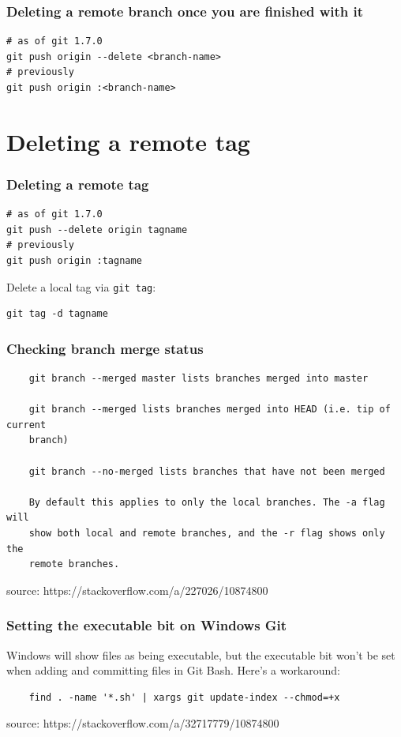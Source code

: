\documentclass{git_course}
\begin{document}
\begin{frame}[fragile]
    \frametitle{Deleting a remote branch once you are finished with it}

\begin{lstlisting}
# as of git 1.7.0
git push origin --delete <branch-name>
# previously
git push origin :<branch-name>
\end{lstlisting}
\end{frame}

\section{Deleting a remote tag}

\begin{frame}[fragile]
\frametitle{Deleting a remote tag}

\begin{lstlisting}
# as of git 1.7.0
git push --delete origin tagname
# previously
git push origin :tagname
\end{lstlisting}

Delete a local tag via \texttt{git tag}:
\begin{lstlisting}
git tag -d tagname
\end{lstlisting}
\end{frame}

\begin{frame}[fragile]
\frametitle{Checking branch merge status}
    \begin{lstlisting}
    git branch --merged master lists branches merged into master

    git branch --merged lists branches merged into HEAD (i.e. tip of current
    branch)

    git branch --no-merged lists branches that have not been merged

    By default this applies to only the local branches. The -a flag will
    show both local and remote branches, and the -r flag shows only the
    remote branches.
    \end{lstlisting}
    source: https://stackoverflow.com/a/227026/10874800
\end{frame}

\begin{frame}[fragile]
\frametitle{Setting the executable bit on Windows Git}
Windows will show files as being executable, but the executable bit won't be
set when adding and committing files in Git Bash.  Here's a workaround:
    \begin{lstlisting}
    find . -name '*.sh' | xargs git update-index --chmod=+x
    \end{lstlisting}
    source: https://stackoverflow.com/a/32717779/10874800
\end{frame}
\end{document}
